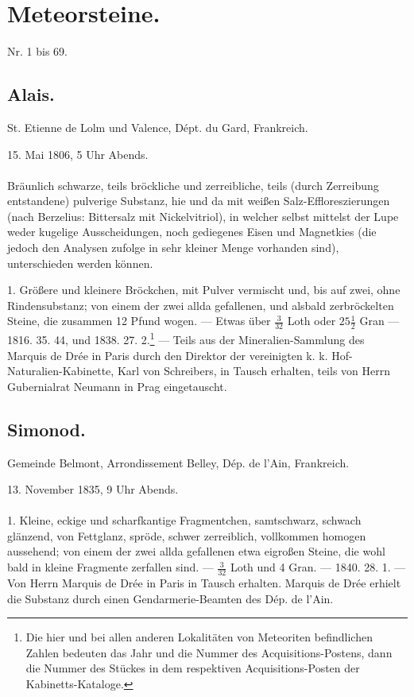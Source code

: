 \documentclass[a4paper, 11pt, oneside, polutonikogreek, german]{article}
\begin{document}
\section{Meteorsteine.}
\begin{center}
Nr. 1 bis 69.
\end{center}
\subsection{Alais.}
\begin{center}
\small
St. Etienne de Lolm und Valence, Dépt. du Gard, Frankreich.

15. Mai 1806, 5 Uhr Abends.
\end{center}
\paragraph{}
Bräunlich schwarze, teils bröckliche und zerreibliche, teils (durch Zerreibung entstandene) pulverige Substanz, hie und da mit weißen Salz-Effloreszierungen (nach Berzelius: Bittersalz mit Nickelvitriol), in welcher selbst mittelst der Lupe weder kugelige Ausscheidungen, noch gediegenes Eisen und Magnetkies (die jedoch den Analysen zufolge in sehr kleiner Menge vorhanden sind), unterschieden werden können.

1. Größere und kleinere Bröckchen, mit Pulver vermischt und, bis auf zwei, ohne Rindensubstanz; von einem der zwei allda gefallenen, und alsbald zerbröckelten Steine, die zusammen 12 Pfund wogen. — Etwas über $\frac{3}{32}$ Loth oder $25\frac{1}{2}$ Gran — 1816. 35. 44, und 1838. 27. 2.\footnote{Die hier und bei allen anderen Lokalitäten von Meteoriten befindlichen Zahlen bedeuten das Jahr und die Nummer des Acquisitions-Postens, dann die Nummer des Stückes in dem respektiven Acquisitions-Posten der Kabinetts-Kataloge.} — Teils aus der Mineralien-Sammlung des Marquis de Drée in Paris durch den Direktor der vereinigten k. k. Hof-Naturalien-Kabinette, Karl von Schreibers, in Tausch erhalten, teils von Herrn Gubernialrat Neumann in Prag eingetauscht.
\subsection{Simonod.}
\begin{center}
\small
Gemeinde Belmont, Arrondissement Belley, Dép. de l’Ain, Frankreich.

13. November 1835, 9 Uhr Abends.
\end{center}
\paragraph{}
1. Kleine, eckige und scharfkantige Fragmentchen, samtschwarz, schwach glänzend, von Fettglanz, spröde, schwer zerreiblich, vollkommen homogen aussehend; von einem der zwei allda gefallenen etwa eigroßen Steine, die wohl bald in kleine Fragmente zerfallen sind. — $\frac{3}{32}$ Loth und 4 Gran. — 1840. 28. 1. — Von Herrn Marquis de Drée in Paris in Tausch erhalten. Marquis de Drée erhielt die Substanz durch einen Gendarmerie-Beamten des Dép. de l'Ain.
\end{document}
